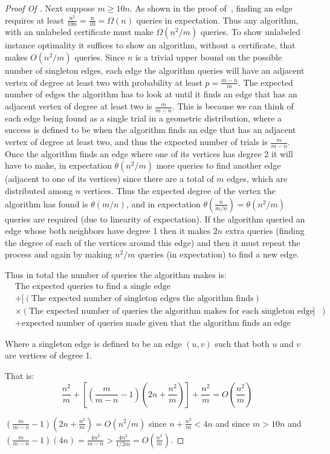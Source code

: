 \documentclass[11pt]{article}
\numberwithin{equation}{section}
\newcommand{\1}{\mathbf{1}}
\newcommand{\beq}{\begin{equation}}
\newcommand{\eeq}{\end{equation}}
\begin{document}
\begin{proof}[Proof Of ]
Next suppose $m \ge 10n$. As shown in the proof of~, finding an edge requires at least $\frac{n^2}{10n} = \frac{n}{10} = \Omega(n)$ queries in expectation. Thus any algorithm, with an unlabeled certificate must make $\Omega(n^2/m)$ queries. To show unlabeled instance optimality it suffices to show an algorithm, without a certificate, that makes $O(n^2/m)$ queries. Since $n$ is a trivial upper bound on the possible number of singleton edges, each edge the algorithm queries will have an adjacent vertex of degree at least two with probability at least $p = \frac{m-n}{m}$. The expected number of edges the algorithm has to look at until it finds an edge that has an adjacent vertex of degree at least two is $\frac{m}{m-n}$. This is because we can think of each edge being found as a single trial in a geometric distribution, where a success is defined to be when the algorithm finds an edge that has an adjacent vertex of degree at least two, and thus the expected number of trials is $\frac{m}{m-n}$. Once the algorithm finds an edge where one of its vertices has degree 2 it will have to make, in expectation $\theta(n^2/m)$ more queries to find another edge (adjacent to one of its vertices) since there are a total of $m$ edges, which are distributed among $n$ vertices. Thus the expected degree of the vertex the algorithm has found is $\theta(m/n)$, and in expectation $\theta(\frac{n}{m/n}) = \theta(n^2/m)$ queries are required (due to linearity of expectation). If the algorithm queried an edge whose both neighbors have degree 1 then it makes $2n$ extra queries (finding the degree of each of the vertices around this edge) and then it must repeat the process and again by making $n^2/m$ queries (in expectation) to find a new edge.


 Thus in total the number of queries the algorithm makes is:\begin{align*}& \text{The expected queries to find a single edge } \\& + [ \left(\text{The expected number of singleton edges the algorithm finds}\right) \\& \times \left(\text{The expected number of queries the algorithm makes for each singleton edge it finds}\right)  ]\\&+ \text{expected number of queries made given that the algorithm finds an edge which is not a singelton edge} \end{align*} 
 
Where a singleton edge is defined to be an edge $(u,v)$ such that both $u$ and $v$ are vertices of degree 1.

 
 That is: 
  \beq \frac{n^2}{m} + \left[\left(\frac{m}{m-n} - 1\right) \left(2n + \frac{n^2}{m}\right) \right]+ \frac{n^2}{m} = O\left(\frac{n^2}{m}\right) \eeq

$\left(\frac{m}{m-n} - 1\right) \left(2n + \frac{n^2}{m}\right)  = O(n^2/m)$ since $n + \frac{n^2}{m} < 4n$ and since $m > 10n$ and $\left(\frac{m}{m-n} - 1\right) \left(4n\right) = \frac{4n^2}{m - n} >  \frac{4n^2}{1/2m} = O( \frac{n^2}{m})$. 



\end{proof}
\fi
\end{document}
